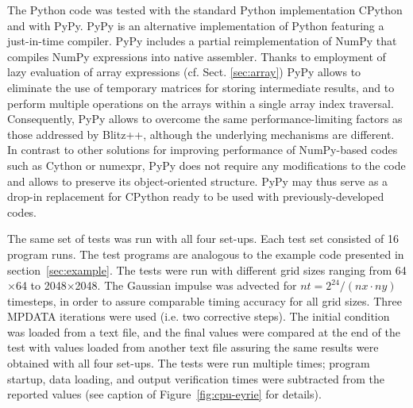 \documentclass[final,5p,times,twocolumn]{elsarticle}
\begin{document}
  The Python code was tested with the standard Python implementation CPython and with PyPy.
  PyPy is an alternative implementation of Python featuring a just-in-time compiler. 
  PyPy includes a partial reimplementation of NumPy that compiles NumPy expressions into native assembler.
  Thanks to employment of lazy evaluation of array expressions (cf. Sect. \ref{sec:array})
    PyPy allows to eliminate the use of temporary matrices for storing intermediate results,
    and to perform multiple operations on the arrays within a single array index traversal.
  Consequently, PyPy allows to overcome the same performance-limiting factors as those addressed by Blitz++, although 
    the underlying mechanisms are different.
  In contrast to other solutions for improving performance of NumPy-based codes such as
    Cython or numexpr, PyPy does not require
    any modifications to the code and allows to preserve its object-oriented structure.
  PyPy may thus serve as a drop-in replacement for CPython ready to be used with 
    previously-developed codes.
  
  The same set of tests was run with all four set-ups.
  Each test set consisted of 16 program runs.
  The test programs are analogous to the example code presented in section~\ref{sec:example}.
  The tests were run with different grid sizes ranging from 64$\times$64 to 2048$\times$2048.
  The Gaussian impulse was advected for $nt=2^{24}/(nx\cdot ny)$ timesteps, 
    in order to assure comparable timing accuracy for all grid sizes.
  Three MPDATA iterations were used (i.e. two corrective steps).
  The initial condition was loaded from a text file, and the final values were compared at the end of the test
    with values loaded from another text file assuring the same results were obtained with all four set-ups.
  The tests were run multiple times; program startup, data loading, and output verification times were
    subtracted from the reported values (see caption of Figure~\ref{fig:cpu-eyrie} for details).
\end{document}
